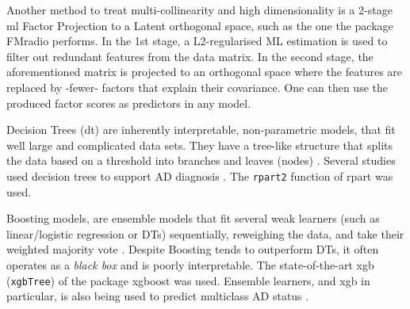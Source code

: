 \documentclass{amsart}
\begin{document}
Another method to treat multi-collinearity and high dimensionality is a 2-stage \acrfull{ml} Factor Projection to a Latent orthogonal space, such as the one the package \textsf{FMradio} \cite{Peeters2019StableData} performs. In the 1st stage, a L2-regularised ML estimation is used to filter out redundant features from the data matrix. In the second stage, the aforementioned matrix is projected to an orthogonal space where the features are replaced by -fewer- factors that explain their covariance. One can then use the produced factor scores as predictors in any model.

Decision Trees (\acrshort{dt}) are inherently interpretable, non-parametric models, that fit well large and complicated data sets. They have a tree-like structure that splits the data based on a threshold into branches and leaves (nodes) \cite{Song2015DecisionPrediction}. Several studies used decision trees to support AD diagnosis \cite{saputra2020detecting,dana2014using,kumar2017new,mofrad2019decision}. The \texttt{rpart2} \cite{rpart} function of \textsf{rpart} was used.

Boosting models, are ensemble models that fit several weak learners (such as linear/logistic regression or DTs) sequentially, reweighing the data, and take their weighted majority vote \cite{Friedman2000boosting,Friedman2001gbm}. Despite Boosting tends to outperform DTs, it often operates as a \textit{black box} and is poorly interpretable. The state-of-the-art \acrlong{xgb} (\texttt{xgbTree}) of the package \textsf{xgboost} \cite{Chen2016XGBoost:System} was used. Ensemble learners, and \acrshort{xgb} in particular, is also being used to predict multiclass AD status \cite{zhang2024multiclass,app13148298}.

\end{document}
